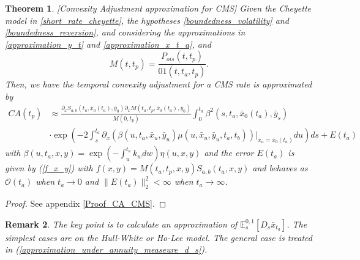 \documentclass[a4paper,10pt]{article}
\newtheorem{theorem}{Theorem}[section]
\newtheorem{remark}[theorem]{Remark}
\newcommand{\1}{\mathbf{1}}
\begin{document}
\begin{theorem}\label{Th_CA_CMS}[Convexity Adjustment approximation for CMS]
Given the Cheyette model in \eqref{short_rate_cheyette}, the hypotheses \ref{boundedness_volatility} and \ref{boundedness_reversion}, and considering the approximations in \eqref{approximation_y_t} and \eqref{approximation_x_t_a}, and
\begin{equation}
M(t,t_p)= \frac{P_{ois}(t,t_p)}{01(t,t_a,t_p)}.
\end{equation}
Then, we have the temporal convexity adjustment for a CMS rate is approximated by
\begin{align} \label{cms_first_order_convexity}
CA(t_p) &\approx  \frac{\partial_x S_{a,b}(t_a,\bar{x}_0(t_a), \bar{y}_0) \partial_x M(t_a,t_p,\bar{x}_0(t_a), \bar{y}_0)}{M(0,t_p)} \int_{0}^{t_a}  \beta^2(s,t_a,\bar{x}_0(t_a),\bar{y}_s) \\
&\cdot  \exp\left(-2\int_{s}^{t_a}\partial_x (\beta(u,t_a,\bar{x}_u,\bar{y}_u) \mu(u,\bar{x}_u, \bar{y}_u,t_a,t_b))|_{\bar{x}_u=\bar{x}_{0}(t_a)}  du \right)ds + E(t_a)\nonumber 
\end{align}
with  $\beta(u,t_a,x,y) = \exp\left(-\int_{u}^{t_a}k_w dw\right)\eta(u,x,y)$ and the error $E(t_a)$ is given by (\ref{f_x_y}) with $f(x,y)=M(t_a,t_p,x,y)S_{a,b}(t_a,x,y)$ and behaves as $\mathcal{O}(t_a)$ when $t_a \to 0$ and $\|E(t_a)\|^{2}_{2} < \infty$ when $t_a \to \infty$.
\end{theorem}
\begin{proof}
See appendix \ref{Proof_CA_CMS}.
\end{proof}

\begin{remark}
The key point is to calculate an approximation of $\mathbb{E}_s^{0,1}\left[ D_s \bar{x}_{t_a}\right]$. The simplest cases are on the Hull-White or Ho-Lee model. The general case is treated in (\ref{approximation_under_annuity_measeure_d_s}). 
\end{remark}
\end{document}
